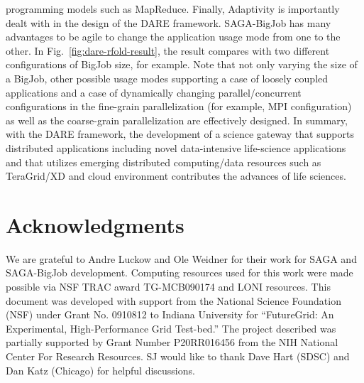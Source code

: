 \documentclass{sig-alternate}
\begin{document}
programming models such as MapReduce.  Finally, Adaptivity is
importantly dealt with in the design of the DARE framework.
SAGA-BigJob has many advantages to be agile to change the application
usage mode from one to the other.  In
Fig.~\ref{fig:dare-rfold-result}, the result compares with two
different configurations of BigJob size, for example.  Note that not
only varying the size of a BigJob, other possible usage modes
supporting a case of loosely coupled applications and a case of
dynamically changing parallel/concurrent configurations in the
fine-grain parallelization (for example, MPI configuration) as well as
the coarse-grain parallelization are effectively designed.
In summary, with the DARE framework, the development of a science gateway that supports distributed applications including novel data-intensive life-science applications and that utilizes emerging distributed computing/data resources such as TeraGrid/XD and cloud environment contributes the advances of life sciences.    


\section{Acknowledgments}
We are grateful to Andre Luckow and Ole Weidner for their work for
SAGA and SAGA-BigJob development.  Computing resources used for this
work were made possible via NSF TRAC award TG-MCB090174 and LONI
resources.  This document was developed with support from the National
Science Foundation (NSF) under Grant No.  0910812 to Indiana
University for ``FutureGrid: An Experimental, High-Performance Grid
Test-bed.'' The project described was partially supported by Grant
Number P20RR016456 from the NIH National Center For Research
Resources. SJ would like to thank Dave Hart (SDSC) and Dan Katz
(Chicago) for helpful discussions.  



\end{document}
